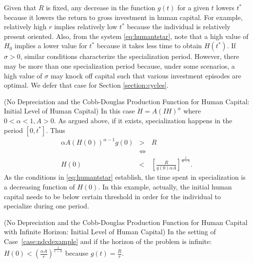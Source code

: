 \indent Given that $R$ is fixed, any decrease in the function $g(t)$ for a given $t$ lowers $t^*$ because it lowers the return to gross investment in human capital. For example, relatively high $r$ implies relatively low $t^*$ because the individual is relatively present oriented. %
 Also, from the system \eqref{eq:humantstar}, note that a high value of $H_0$ implies a lower value for $t^*$ because it takes less time to obtain $H(t^*)$. If $\sigma > 0 $, similar conditions characterize the specialization period. However, there may be more than one specialization period because, under some scenarios, a high value of $\sigma$ may knock off capital such that various investment episodes are optimal. We defer that case for Section \ref{section:cycles}.
\begin{case} (No Depreciation and the Cobb-Douglas Production Function for Human Capital: Initial Level of Human Capital) \label{case:ndcdexample}
In this case $\dot{H} = A \left(IH \right)^\alpha$ where $0 < \alpha < 1, A>0$. As argued above, if it exists, specialization happens in the period $[0,t^*]$. Thus
\begin{eqnarray}
	\alpha A \left( H(0) \right) ^{\alpha - 1 }g(0) &>& R \nonumber \\
	&\Leftrightarrow& \nonumber \\
	H(0) &<& \left[ \frac{R}{g(0)\alpha A} \right]^{\frac{1}{\alpha-1}} \label{eq:h0forspe}.
\end{eqnarray}
\indent As the conditions in \eqref{eq:humantstar} establish, the time spent in specialization is a decreasing function of $H(0)$. In this example, actually, the initial human capital needs to be below certain threshold in order for the individual to specialize during one period. 
\end{case}

\begin{case} (No Depreciation and the Cobb-Douglas Production Function for Human Capital with Infinite Horizon: Initial Level of Human Capital)
In the setting of Case~\ref{case:ndcdexample} and if the horizon of the problem is infinite: $H(0) < \left( \frac{\alpha A}{r} \right) ^{\frac{1}{1 - \alpha}}$ because $g(t) = \frac{R}{r}$.
\end{case}

